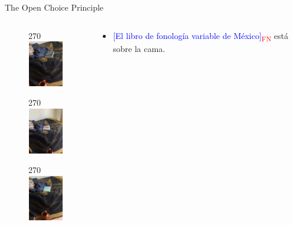 \documentclass{beamer}
\begin{document}
\begin{frame}{The Open Choice Principle}
    \begin{columns}
        \begin{column}{6cm}
            \begin{figure}
                \begin{turn}{270}
                \includegraphics[height=2.0cm, width=1.6cm]{pbm.JPG}
                \end{turn}
            \end{figure}
            \begin{figure}
                \begin{turn}{270}
                \includegraphics[height=2.0cm, width=1.6cm]{hayes.JPG}
                \end{turn}
            \end{figure}
            \begin{figure}
                \begin{turn}{270}
                \includegraphics[height=2.0cm, width=1.6cm]{sonoro.JPG}
                \end{turn}
            \end{figure}
        \end{column}
        \begin{column}{6cm}
        \begin{itemize}
        \vspace{2em}
        \item \textcolor{blue}{{[El libro de fonología variable de México]}}\textcolor{red}{\textsubscript{FN}} está sobre la cama.
        \begin{itemize}

\end{itemize}
\end{itemize}
\end{column}
\end{columns}
\end{frame}
\end{document}

